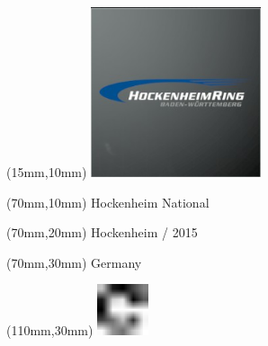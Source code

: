 \null\newpage
\begin{textblock*}{50mm}(15mm,10mm)%
\includegraphics[width=50mm]{LG/2015-05-20_00082.png}
\end{textblock*}
\begin{textblock*}{130mm}(70mm,10mm)%
{\fontsize{20}{20}\selectfont Hockenheim National}\\
\end{textblock*}
\begin{textblock*}{120mm}(70mm,20mm)%
{\fontsize{16}{16}\selectfont Hockenheim / 2015}\\
\end{textblock*}
\begin{textblock*}{120mm}(70mm,30mm)%
{\fontsize{12}{12}\selectfont Germany}
\end{textblock*}
\begin{textblock*}{30mm}(110mm,30mm)%
\centering
\includegraphics[height=15mm]{icons/fa-rotate-right.pdf}
\end{textblock*}
